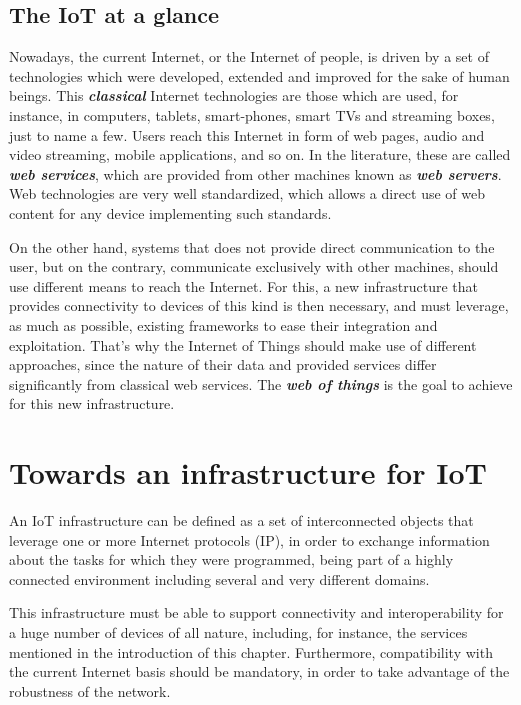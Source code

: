 \subsection{The IoT at a glance}
\label{subsec:IoTAtAGlance}
Nowadays, the current Internet, or the Internet of people, is driven by a set of technologies which were developed, extended and improved for the sake of human beings.
This \textit{\textbf{classical}} Internet technologies are those which are used, for instance, in computers, tablets, smart-phones, smart TVs and streaming boxes, just to name a few.
Users reach this Internet in form of web pages, audio and video streaming, mobile applications, and so on.
In the literature, these are called \textit{\textbf{web services}}, which are provided from other machines known as \textit{\textbf{web servers}}.
Web technologies are very well standardized, which allows a direct use of web content for any device implementing such standards.

On the other hand, systems that does not provide direct communication to the user, but on the contrary, communicate exclusively with other machines, should use different means to reach the Internet.
For this, a new infrastructure that provides connectivity to devices of this kind is then necessary, and must leverage, as much as possible, existing frameworks to ease their integration and exploitation.
That's why the Internet of Things should make use of different approaches, since the nature of their data and provided services differ  significantly from classical web services.
The \textit{\textbf{web of things}}\cite{duquennoy2009webofthings} is the goal to achieve for this new infrastructure.

\section{Towards an infrastructure for IoT}
\label{sec:IoTInfra}
An IoT infrastructure can be defined as a set of interconnected objects that leverage one or more Internet protocols (IP), in order to exchange information about the tasks for which they were programmed, being part of a highly connected environment including several and very different domains.

This infrastructure must be able to support connectivity and interoperability for a huge number of devices of all nature, including, for instance, the services mentioned in the introduction of this chapter.
Furthermore, compatibility with the current Internet basis should be mandatory, in order to take advantage of the robustness of the network.

